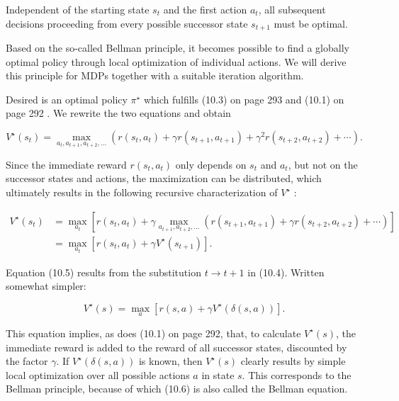 \documentclass[10pt]{article}
\begin{document}
Independent of the starting state $s_{t}$ and the first action $a_{t}$, all subsequent decisions proceeding from every possible successor state $s_{t+1}$ must be optimal.

Based on the so-called Bellman principle, it becomes possible to find a globally optimal policy through local optimization of individual actions. We will derive this principle for MDPs together with a suitable iteration algorithm.

Desired is an optimal policy $\pi^{\star}$ which fulfills (10.3) on page 293 and (10.1) on page 292 . We rewrite the two equations and obtain


\begin{equation*}
V^{\star}\left(s_{t}\right)=\max _{a_{t}, a_{t+1}, a_{t+2}, \ldots}\left(r\left(s_{t}, a_{t}\right)+\gamma r\left(s_{t+1}, a_{t+1}\right)+\gamma^{2} r\left(s_{t+2}, a_{t+2}\right)+\cdots\right) . \tag{10.4}
\end{equation*}


Since the immediate reward $r\left(s_{t}, a_{t}\right)$ only depends on $s_{t}$ and $a_{t}$, but not on the successor states and actions, the maximization can be distributed, which ultimately results in the following recursive characterization of $V^{\star}$ :


\begin{align*}
V^{\star}\left(s_{t}\right) & =\max _{a_{t}}\left[r\left(s_{t}, a_{t}\right)+\gamma \max _{a_{t+1}, a_{t+2}, \ldots}\left(r\left(s_{t+1}, a_{t+1}\right)+\gamma r\left(s_{t+2}, a_{t+2}\right)+\cdots\right)\right] \\
& =\max _{a_{t}}\left[r\left(s_{t}, a_{t}\right)+\gamma V^{\star}\left(s_{t+1}\right)\right] . \tag{10.5}
\end{align*}


Equation (10.5) results from the substitution $t \rightarrow t+1$ in (10.4). Written somewhat simpler:


\begin{equation*}
V^{\star}(s)=\max _{a}\left[r(s, a)+\gamma V^{\star}(\delta(s, a))\right] . \tag{10.6}
\end{equation*}


This equation implies, as does (10.1) on page 292, that, to calculate $V^{\star}(s)$, the immediate reward is added to the reward of all successor states, discounted by the factor $\gamma$. If $V^{\star}(\delta(s, a))$ is known, then $V^{\star}(s)$ clearly results by simple local optimization over all possible actions $a$ in state $s$. This corresponds to the Bellman principle, because of which (10.6) is also called the Bellman equation.
\end{document}
